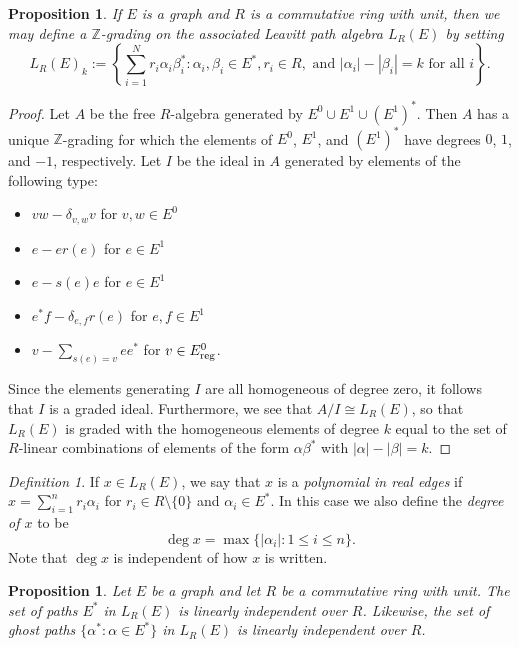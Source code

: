 \documentclass[11pt]{amsart}
\newtheorem{proposition}[theorem]{Proposition}
\theoremstyle{remark}
\newtheorem{definition}[theorem]{Definition}
\numberwithin{equation}{section}
\newcommand{\Z}{\mathbb{Z}}
\begin{document}
\begin{proposition} \label{L(E)-Z-graded}
If $E$ is a graph and $R$ is a commutative ring with unit, then we may define a $\Z$-grading on the associated Leavitt path algebra $L_R(E)$ by setting $$L_R(E)_k := \left\{ \sum_{i=1}^N r_i \alpha_i \beta_i^* : \alpha_i, \beta_i \in E^*, r_i \in R, \text{ and } |\alpha_i | - | \beta_i| = k \text{ for all $i$} \right\}.$$
\end{proposition}

\begin{proof}
Let $A$ be the free $R$-algebra generated by $E^0 \cup E^1 \cup (E^1)^*$.  Then $A$ has a unique $\Z$-grading for which the elements of $E^0$, $E^1$, and $(E^1)^*$ have degrees $0$, $1$, and $-1$, respectively.  Let $I$ be the ideal in $A$ generated by elements of the following type:
\begin{itemize}
\item $vw - \delta_{v,w} v$ for $v, w \in E^0$
\item $e-er(e)$ for $e \in E^1$
\item $e-s(e)e$ for $e \in E^1$
\item $e^*f - \delta_{e,f} r(e)$ for $e,f \in E^1$
\item $v - \sum_{s(e)=v} ee^*$ for $v \in E^0_\textnormal{reg}$.
\end{itemize}
Since the elements generating $I$ are all homogeneous of degree zero, it follows that $I$ is a graded ideal.  Furthermore, we see that $A/I \cong L_R(E)$, so that $L_R(E)$ is graded with the homogeneous elements of degree $k$ equal to the set of $R$-linear combinations of elements of the form $\alpha \beta^*$ with $|\alpha | - | \beta| = k$.
\end{proof}


\begin{definition}
If $x \in L_R(E)$, we say that $x$ is a \emph{polynomial in real edges} if $x = \sum_{i=1}^n r_i \alpha_i$ for $r_i \in R \setminus \{ 0 \}$ and $\alpha_i \in E^*$.  In this case we also define the \emph{degree of $x$} to be $$\deg x = \max \{ | \alpha_i| : 1 \leq i \leq n \}.$$  Note that $\deg x$ is independent of how $x$ is written.
\end{definition}

\begin{proposition} \label{lin-ind-prop}
Let $E$ be a graph and let $R$ be a commutative ring with unit.  The set of paths $E^*$ in $L_R(E)$ is linearly independent over $R$.  Likewise, the set of ghost paths $\{ \alpha^* : \alpha \in E^* \}$ in $L_R(E)$ is linearly independent over $R$. 
\end{proposition}
\end{document}
